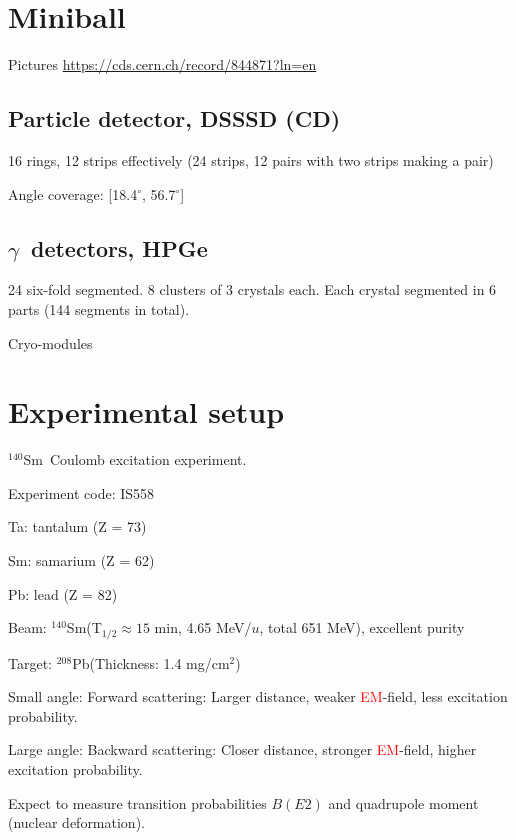 \documentclass[twoside,english]{uiofysmaster/uiofysmaster}
\newcommand{\Sm}{$^{140}$Sm} %
\newcommand{\Pb}{$^{208}$Pb}
\newcommand{\ga}{$\gamma$}
\begin{document}
\section{Miniball}

Pictures \url{https://cds.cern.ch/record/844871?ln=en}

\subsection{Particle detector, DSSSD (CD)}

16 rings, 12 strips effectively (24 strips, 12 pairs with two strips making a pair)

Angle coverage: [18.4$^\circ$, 56.7$^\circ$]


\subsection{\ga\ detectors, HPGe}

24 six-fold segmented. 8 clusters of 3 crystals each. Each crystal segmented in 6 parts (144 segments in total).

\bigskip

Cryo-modules

\section{Experimental setup}
\Sm ~Coulomb excitation experiment.

Experiment code: IS558 

Ta: tantalum (Z = 73)

Sm: samarium (Z = 62)

Pb: lead (Z = 82) \newline



Beam: \Sm (T$_{1/2} \approx 15$ min, 4.65 MeV/$u$, total 651 MeV), excellent purity

Target: \Pb (Thickness: 1.4 mg/cm$^2$)


Small angle: Forward scattering: Larger distance, weaker \textcolor{red}{EM}-field, less excitation probability.

Large angle: Backward scattering: Closer distance, stronger \textcolor{red}{EM}-field, higher excitation probability. \newline


\bigskip

Expect to measure transition probabilities $B(E2)$ and quadrupole moment (nuclear deformation). 
\end{document}

